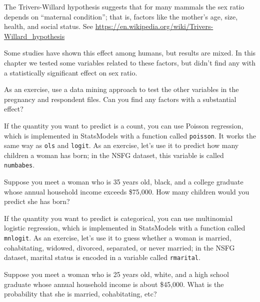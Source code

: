 \begin{exercise}
The Trivers-Willard hypothesis suggests that for many mammals the
sex ratio depends on ``maternal condition''; that is,
factors like the mother's age, size, health, and social status.
See \url{https://en.wikipedia.org/wiki/Trivers-Willard_hypothesis}

Some studies have shown this effect among humans, but results are
mixed.  In this chapter we tested some variables related to these
factors, but didn't find any with a statistically significant effect
on sex ratio.
   

As an exercise, use a data mining approach to test the other variables
in the pregnancy and respondent files.  Can you find any factors with
a substantial effect?  

\end{exercise}


\begin{exercise}
If the quantity you want to predict is a count, you can use Poisson
regression, which is implemented in StatsModels with a function called
{\tt poisson}.  It works the same way as {\tt ols} and {\tt logit}.
As an exercise, let's use it to predict how many children a woman
has born; in the NSFG dataset, this variable is called {\tt numbabes}.

Suppose you meet a woman who is 35 years old, black, and a college
graduate whose annual household income exceeds \$75,000.  How many
children would you predict she has born?
\end{exercise}


\begin{exercise}
If the quantity you want to predict is categorical, you can use
multinomial logistic regression, which is implemented in StatsModels
with a function called {\tt mnlogit}.  As an exercise, let's use it to
guess whether a woman is married, cohabitating, widowed, divorced,
separated, or never married; in the NSFG dataset, marital status is
encoded in a variable called {\tt rmarital}.

Suppose you meet a woman who is 25 years old, white, and a high
school graduate whose annual household income is about \$45,000.
What is the probability that she is married, cohabitating, etc?
\end{exercise}




